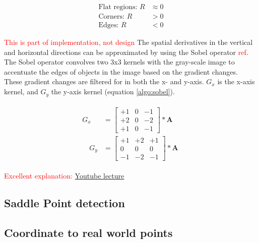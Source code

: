 \documentclass{article}
\newcommand{\rf}[1]{\textcolor{red}{#1}}
\begin{document}
\begin{align*}
    \text{Flat regions:   } R &\approx 0\\
    \text{Corners:   } R &>0 \\
    \text{Edges:   } R &< 0
\end{align*}


\rf{This is part of implementation, not design}
The spatial derivatives in the vertical and horizontal directions can be approximated by using the Sobel operator \rf{ref}.  The Sobel operator convolves two 3x3 kernels with the gray-scale image to accentuate the edges of objects in the image based on the gradient changes.  These gradient changes are filtered for in both the x- and y-axis.  $G_x$ is the x-axis kernel, and $G_y$ the y-axis kernel (equation \ref{algo:sobel}).


\begin{align}
    \begin{split} \label{algo:sobel}
    G_x&=\left[\begin{array}{lll}
        +1 & 0 & -1 \\
        +2 & 0 & -2 \\
        +1 & 0 & -1
        \end{array}\right] * \mathbf{A} \quad \\
    \quad G_y&=\left[\begin{array}{ccc}
        +1 & +2 & +1 \\
        0 & 0 & 0 \\
        -1 & -2 & -1
        \end{array}\right] * \mathbf{A}
    \end{split}
\end{align}

\rf{Excellent explanation: \href{https://www.youtube.com/watch?v=_qgKQGsuKeQ&t=2545s}{Youtube lecture}}

\subsection{Saddle Point detection}



\subsection{Coordinate to real world points}
\end{document}
